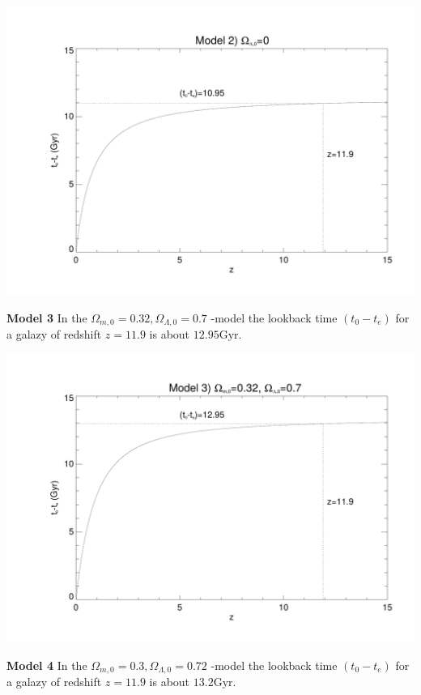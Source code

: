 \documentclass[a4paper,12pt]{article}
\begin{document}
\begin{itemize}
\centerline{\includegraphics[scale=0.6]{advanced_part6b.pdf}}

\vspace*{0.5cm}
\newpage
\textbf{Model 3}
In the $\Omega_{m,0}=0.32, \Omega_{\Lambda,0}=0.7$ -model the lookback time $(t_0-t_e)$ for a galazy of redshift $z=11.9$ is about $12.95\text{Gyr}$.

\centerline{\includegraphics[scale=0.6]{advanced_part6c.pdf}}

\vspace*{0.5cm}
\newpage
\textbf{Model 4}
In the $\Omega_{m,0}=0.3, \Omega_{\Lambda,0}=0.72$ -model the lookback time $(t_0-t_e)$ for a galazy of redshift $z=11.9$ is about $13.2\text{Gyr}$.


\end{itemize}
\end{document}
